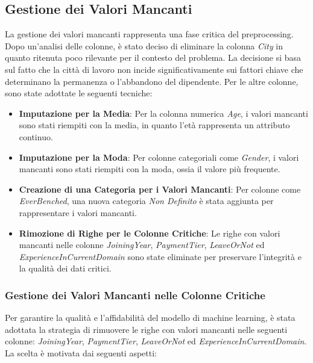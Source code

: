 \documentclass[a4paper,12pt]{article}
\begin{document}
\subsection{Gestione dei Valori Mancanti}
La gestione dei valori mancanti rappresenta una fase critica del preprocessing. Dopo un'analisi delle colonne, è stato deciso di eliminare la colonna \textit{City} in quanto ritenuta poco rilevante per il contesto del problema. La decisione si basa sul fatto che la città di lavoro non incide significativamente sui fattori chiave che determinano la permanenza o l'abbandono del dipendente. Per le altre colonne, sono state adottate le seguenti tecniche:
\begin{itemize}
    \item \textbf{Imputazione per la Media}: Per la colonna numerica \textit{Age}, i valori mancanti sono stati riempiti con la media, in quanto l'età rappresenta un attributo continuo.
    \item \textbf{Imputazione per la Moda}: Per colonne categoriali come \textit{Gender}, i valori mancanti sono stati riempiti con la moda, ossia il valore più frequente.
    \item \textbf{Creazione di una Categoria per i Valori Mancanti}: Per colonne come \textit{EverBenched}, una nuova categoria \textit{Non Definito} è stata aggiunta per rappresentare i valori mancanti.
    \item \textbf{Rimozione di Righe per le Colonne Critiche}: Le righe con valori mancanti nelle colonne \textit{JoiningYear}, \textit{PaymentTier}, \textit{LeaveOrNot} ed \textit{ExperienceInCurrentDomain} sono state eliminate per preservare l'integrità e la qualità dei dati critici.
\end{itemize}

\subsubsection{Gestione dei Valori Mancanti nelle Colonne Critiche}

Per garantire la qualità e l'affidabilità del modello di machine learning, è stata adottata la strategia di rimuovere le righe con valori mancanti nelle seguenti colonne: \textit{JoiningYear}, \textit{PaymentTier}, \textit{LeaveOrNot} ed \textit{ExperienceInCurrentDomain}. La scelta è motivata dai seguenti aspetti:
\end{document}

